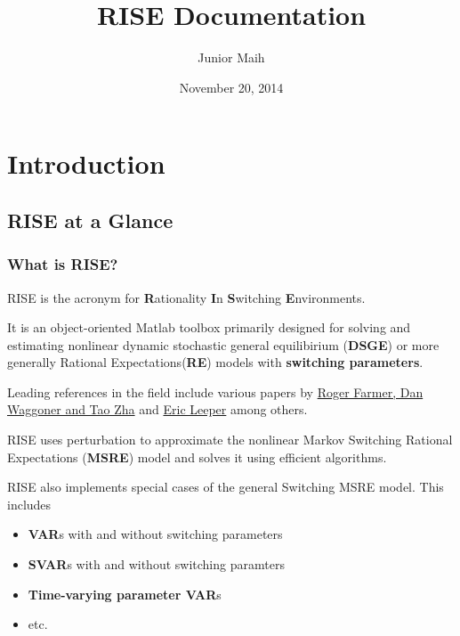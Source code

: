 \documentclass[letterpaper,10pt,english]{sphinxmanual}
\title{RISE Documentation}
\date{November 20, 2014}
\author{Junior Maih}
\begin{document}
\maketitle
\tableofcontents
{}\label{master_doc::doc}



\chapter{Introduction}
\label{introduction:introduction}\label{introduction::doc}\label{introduction:welcome-to-rise-s-documentation}

\section{RISE at a Glance}
\label{intro_folder/rise_at_a_glance::doc}\label{intro_folder/rise_at_a_glance:rise-at-a-glance}

\subsection{What is RISE?}
\label{intro_folder/rise_at_a_glance:what-is-rise}
RISE is the acronym for \textbf{R}ationality \textbf{I}n \textbf{S}witching \textbf{E}nvironments.

It is an object-oriented Matlab toolbox primarily designed for solving and estimating nonlinear
dynamic stochastic general equilibirium (\textbf{DSGE}) or more generally
Rational Expectations(\textbf{RE}) models with \textbf{switching parameters}.

Leading references in the field include various papers by \href{http://www.tzha.net/articles}{Roger Farmer, Dan Waggoner and Tao Zha}
and \href{http://php.indiana.edu/~eleeper/\#Papers}{Eric Leeper} among others.

RISE uses perturbation to approximate the nonlinear Markov Switching Rational
Expectations (\textbf{MSRE}) model and solves it using efficient algorithms.

RISE also implements special cases of the general Switching MSRE model. This includes
\begin{itemize}
\item {} 
\textbf{VAR}s with and without switching parameters

\item {} 
\textbf{SVAR}s with and without switching paramters

\item {} 
\textbf{Time-varying parameter VAR}s

\item {} 
etc.

\end{itemize}
\end{document}
